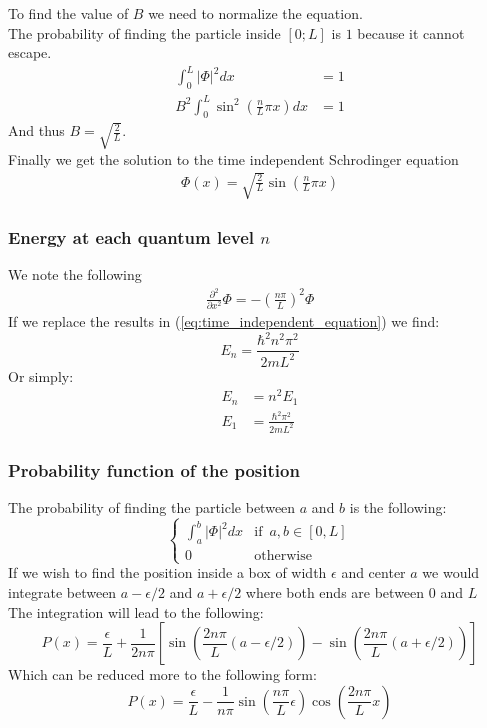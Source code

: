 \documentclass[a4paper, 10pt]{article}
\begin{document}
        To find the value of $B$ we need to normalize the equation.\\
        The probability of finding the particle inside $[0; L]$ is $1$ because
        it cannot escape.
        \begin{align}
            \int_{0}^{L} |\Phi|^2 dx &= 1  \\
            B^2\int_{0}^{L} \sin^2\left ( \frac{n}{L}\pi x \right ) dx &= 1
        \end{align}
        And thus $B = \sqrt{\frac{2}{L}}$.\\
        Finally we get the solution to the time independent Schrodinger equation
        \begin{align}
            \Phi(x) = \sqrt{\frac{2}{L}}\sin(\frac{n}{L}\pi x)
        \end{align}

        \subsubsection{Energy at each quantum level $n$}
        \label{sec:energy_oned}
        We note the following
        \begin{align}
            \frac{\partial^2 }{\partial x^2} \Phi = -\left (
            \frac{n\pi}{L}\right )^2 \Phi
        \end{align}
        If we replace the results in (\ref{eq:time_independent_equation}) we find:
        $$ E_n = \frac{\hbar^2 n^2 \pi^2}{ 2 m L^2} $$
        Or simply:
        \begin{align*}
            E_n &= n^2 E_1 \\
            E_1 &= \frac{\hbar^2 \pi^2}{2 m L^2}
        \end{align*}

        \subsubsection{Probability function of the position}
        \label{sec:position_oned}
        The probability of finding the particle between $a$ and $b$ is the following:
        \begin{equation} \label{eq:probability_position}
            \left\{\begin{matrix}
            \int_{a}^{b} |\Phi|^2 dx & \text{if} \; \: a,b \in [0, L] \\ 
            0 & \text{otherwise}
            \end{matrix}\right.
        \end{equation}
        If we wish to find the position inside a box of width $\epsilon$ and
        center $a$ we would integrate between $a-\epsilon/2$ and $a+\epsilon/2$
        where both ends are between $0$ and $L$\\
        The integration will lead to the following:
        $$ P(x) = \frac{\epsilon}{L} + \frac{1}{2n\pi} \left [ 
            \sin\left ( \frac{2n\pi}{L}(a - \epsilon/2)\right ) -
            \sin\left ( \frac{2n\pi}{L}(a + \epsilon/2)\right )
        \right ]$$
        Which can be reduced more to the following form:
        $$ P(x) = \frac{\epsilon}{L} - \frac{1}{n\pi}\sin\left( \frac{n\pi}{L}\epsilon \right)
        \cos\left(\frac{2n\pi}{L}x\right)$$
\end{document}
